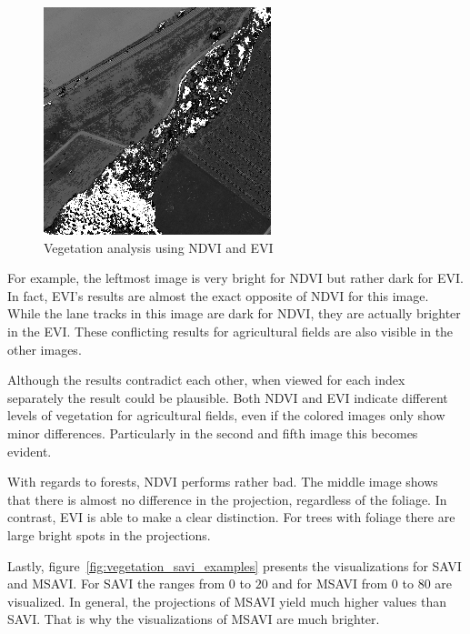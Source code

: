 \begin{figure}
    \includegraphics[width=\VegetationIndicesImageWidth]{images/vegetation/evi/5}

    \caption{Vegetation analysis using NDVI and EVI}
    \label{fig:vegetation_ndvi_examples}
\end{figure}

For example, the leftmost image is very bright for NDVI but rather dark for EVI. In fact, EVI's results are almost the exact opposite of NDVI for this image. While the lane tracks in this image are dark for NDVI, they are actually brighter in the EVI. These conflicting results for agricultural fields are also visible in the other images. 

Although the results contradict each other, when viewed for each index separately the result could be plausible. Both NDVI and EVI indicate different levels of vegetation for agricultural fields, even if the colored images only show minor differences. Particularly in the second and fifth image this becomes evident.

With regards to forests, NDVI performs rather bad. The middle image shows that there is almost no difference in the projection, regardless of the foliage. In contrast, EVI is able to make a clear distinction. For trees with foliage there are large bright spots in the projections.

Lastly, figure~\ref{fig:vegetation_savi_examples} presents the visualizations for SAVI and MSAVI. For SAVI the ranges from $0$ to $20$ and for MSAVI from $0$ to $80$ are visualized. In general, the projections of MSAVI yield much higher values than SAVI. That is why the visualizations of MSAVI are much brighter.

